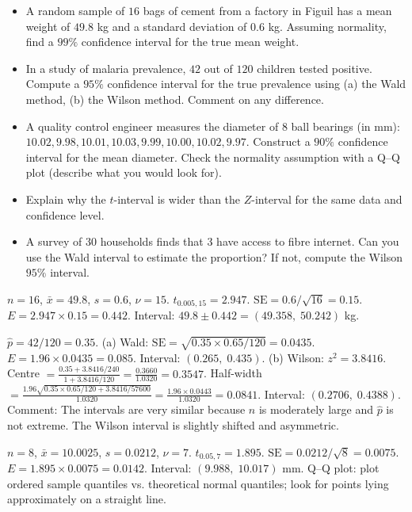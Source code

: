 \documentclass[11pt]{article}
\begin{document}
\begin{exercice}
\begin{itemize}
\item A random sample of $16$ bags of cement from a factory in Figuil has a mean weight of $49.8$ kg and a standard deviation of $0.6$ kg. Assuming normality, find a $99\%$ confidence interval for the true mean weight.
\item In a study of malaria prevalence, $42$ out of $120$ children tested positive. Compute a $95\%$ confidence interval for the true prevalence using (a) the Wald method, (b) the Wilson method. Comment on any difference.
\item A quality control engineer measures the diameter of $8$ ball bearings (in mm): $10.02, 9.98, 10.01, 10.03, 9.99, 10.00, 10.02, 9.97$. Construct a $90\%$ confidence interval for the mean diameter. Check the normality assumption with a Q--Q plot (describe what you would look for).
\item Explain why the $t$-interval is wider than the $Z$-interval for the same data and confidence level.
\item A survey of $30$ households finds that $3$ have access to fibre internet. Can you use the Wald interval to estimate the proportion? If not, compute the Wilson $95\%$ interval.
\end{itemize}
\end{exercice}

\begin{corrige}[Exercise 1]
$n=16$, $\bar{x}=49.8$, $s=0.6$, $\nu=15$. $t_{0.005,15}=2.947$. $\text{SE}=0.6/\sqrt{16}=0.15$. $E=2.947\times0.15=0.442$. Interval: $49.8\pm0.442 = (49.358,\;50.242)$ kg.
\end{corrige}

\begin{corrige}[Exercise 2]
$\hat{p}=42/120=0.35$. 
(a) Wald: $\text{SE}=\sqrt{0.35\times0.65/120}=0.0435$. $E=1.96\times0.0435=0.085$. Interval: $(0.265,\;0.435)$. 
(b) Wilson: $z^2=3.8416$. Centre $=\frac{0.35+3.8416/240}{1+3.8416/120}=\frac{0.3660}{1.0320}=0.3547$. Half-width $=\frac{1.96\sqrt{0.35\times0.65/120+3.8416/57600}}{1.0320}=\frac{1.96\times0.0443}{1.0320}=0.0841$. Interval: $(0.2706,\;0.4388)$. 
Comment: The intervals are very similar because $n$ is moderately large and $\hat{p}$ is not extreme. The Wilson interval is slightly shifted and asymmetric.
\end{corrige}

\begin{corrige}[Exercise 3]
$n=8$, $\bar{x}=10.0025$, $s=0.0212$, $\nu=7$. $t_{0.05,7}=1.895$. $\text{SE}=0.0212/\sqrt{8}=0.0075$. $E=1.895\times0.0075=0.0142$. Interval: $(9.988,\;10.017)$ mm. Q--Q plot: plot ordered sample quantiles vs. theoretical normal quantiles; look for points lying approximately on a straight line.
\end{corrige}
\end{document}
